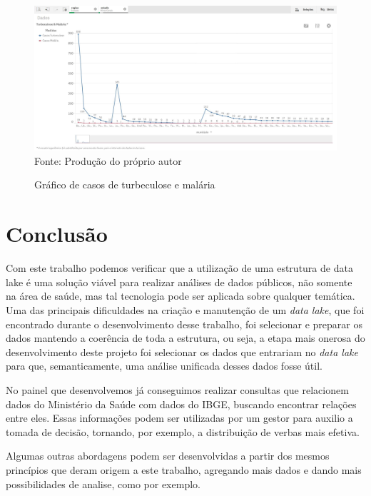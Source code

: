 \documentclass[
	12pt,				%
	openright,			%
	oneside,			%
	a4paper,			%
	chapter=TITLE,		%
	section=TITLE,		%
	subsection=TITLE,	%
	subsubsection=TITLE,%
	english,			%
	brazil				%
	]{abntex2}
\theoremstyle{definition}
\begin{document}
    \begin{figure}[H]
         \centering
         \caption{Gráfico de casos de turbeculose e malária}
         \includegraphics[scale=0.4]{imagens/painel-doenca.JPG}
         \\{\footnotesize Fonte: Produção do próprio autor}
         \label{painel doenca}
    \end{figure}
    
\chapter{Conclusão}
    
    Com este trabalho podemos verificar que a utilização de uma estrutura de data lake é uma solução viável para realizar análises de dados públicos, não somente na área de saúde, mas tal tecnologia pode ser aplicada sobre qualquer temática. Uma das principais dificuldades na criação e manutenção de um \textit{data lake}, que foi encontrado durante o desenvolvimento desse trabalho, foi selecionar e preparar os dados mantendo a coerência de toda a estrutura, ou seja, a etapa mais onerosa do desenvolvimento deste projeto foi selecionar os dados que entrariam no \textit{data lake} para que, semanticamente, uma análise unificada desses dados fosse útil.
    
    No painel que desenvolvemos já conseguimos realizar consultas que relacionem dados do Ministério da Saúde com dados do IBGE, buscando encontrar relações entre eles. Essas informações podem ser utilizadas por um gestor para auxilio a tomada de decisão, tornando, por exemplo, a distribuição de verbas mais efetiva. 
    
    Algumas outras abordagens podem ser desenvolvidas a partir dos mesmos princípios que deram origem a este trabalho, agregando mais dados e dando mais possibilidades de analise, como por exemplo. 
\end{document}
